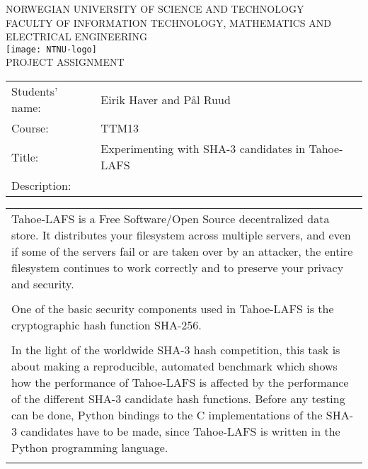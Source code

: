 %
\begin{titlepage}
\begin{center}
\textsc{NORWEGIAN UNIVERSITY OF SCIENCE AND TECHNOLOGY\\
FACULTY OF  INFORMATION TECHNOLOGY, MATHEMATICS AND ELECTRICAL ENGINEERING} \\
\vspace{0.5cm} 
\texttt{[image: NTNU-logo]} \\

\vspace{1.0cm}
{\Huge{PROJECT ASSIGNMENT}}
\vspace{1.0cm}

\begin{tabular}{ p{4cm} p{11cm}}

Students' name:	& Eirik Haver and Pål Ruud \\
Course: & TTM13 \\
Title: & Experimenting with SHA-3 candidates in Tahoe-LAFS \\
Description: & \\
\end{tabular}
{\small{\begin{tabular}{p{15cm}}
\vspace{0.2cm}

Tahoe-LAFS is a Free Software/Open Source decentralized data store. It
distributes your filesystem across multiple servers, and even if some of the
servers fail or are taken over by an attacker, the entire filesystem continues
to work correctly and to preserve your privacy and security.
\\\\
One of the basic security components used in Tahoe-LAFS is the cryptographic
hash function SHA-256.
\\\\
In the light of the worldwide SHA-3 hash competition, this task is about
making a reproducible, automated benchmark which shows how the performance of
Tahoe-LAFS is affected by the performance of the different SHA-3 candidate hash
functions. Before any testing can be done, Python bindings to the C
implementations of the SHA-3 candidates have to be made, since Tahoe-LAFS is
written in the Python programming language.
\\\\
\end{tabular}  }}


\end{center}
\end{titlepage}
